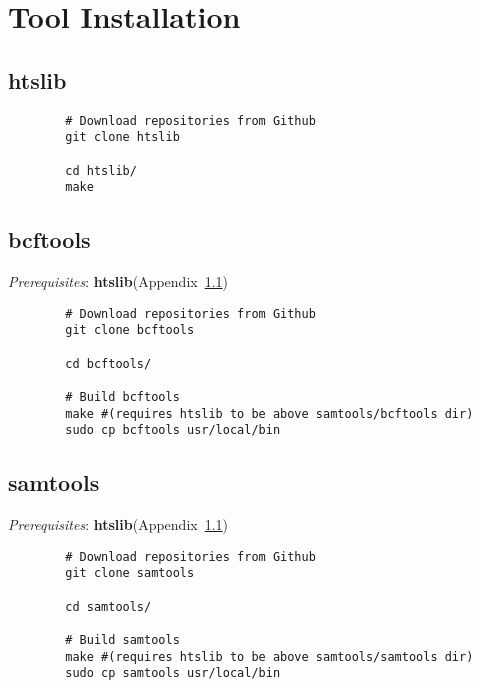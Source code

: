 \chapter{Tool Installation}
\label{app:install}

\section{htslib}
\label{app:install-htslib}
\begin{listing}[H]
    \begin{verbatim}
        # Download repositories from Github
        git clone htslib

        cd htslib/
        make

    \end{verbatim}
\end{listing}

\section{bcftools}
\label{app:install-bcftools}

\textit{Prerequisites}: \textbf{htslib}(Appendix~\ref{app:install-htslib})

\begin{listing}[H]
    \begin{verbatim}
        # Download repositories from Github
        git clone bcftools

        cd bcftools/

        # Build bcftools
        make #(requires htslib to be above samtools/bcftools dir)
        sudo cp bcftools usr/local/bin
    \end{verbatim}
\end{listing}

\section{samtools}
\label{app:install-samtools}

\textit{Prerequisites}: \textbf{htslib}(Appendix~\ref{app:install-htslib})

\begin{listing}[H]
    \begin{verbatim}
        # Download repositories from Github
        git clone samtools

        cd samtools/

        # Build samtools
        make #(requires htslib to be above samtools/samtools dir)
        sudo cp samtools usr/local/bin
    \end{verbatim}
\end{listing}

